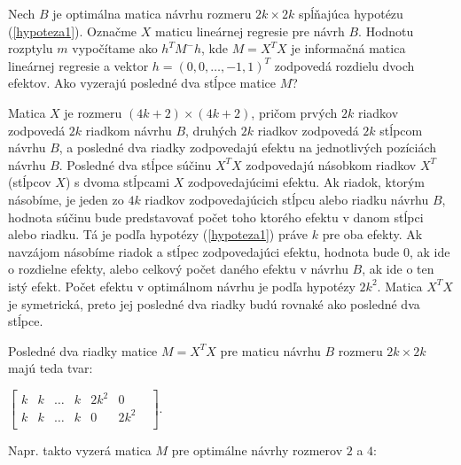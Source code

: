 \begin{dokaz}
Nech $B$ je optimálna matica návrhu rozmeru $2k \times 2k$ spĺňajúca hypotézu (\ref{hypoteza1}). Označme $X$ maticu lineárnej regresie pre návrh $B$. Hodnotu rozptylu $m$ vypočítame ako $h^T M^- h$,
kde $M = X^T X$ je informačná matica lineárnej regresie a vektor $h = (0, 0, \ldots, -1, 1)^T $ zodpovedá rozdielu dvoch efektov. Ako vyzerajú posledné dva stĺpce matice $M$?

Matica $X$ je rozmeru $(4k + 2) \times (4k + 2)$, pričom prvých $2k$ riadkov zodpovedá $2k$ riadkom návrhu $B$, druhých $2k$ riadkov zodpovedá $2k$ stĺpcom návrhu $B$,
a posledné dva riadky zodpovedajú efektu na jednotlivých pozíciách návrhu $B$. Posledné dva stĺpce súčinu $X^T X$ zodpovedajú násobkom riadkov $X^T$ (stĺpcov $X$) s dvoma stĺpcami $X$ zodpovedajúcimi efektu.
Ak riadok, ktorým násobíme, je jeden zo $4k$ riadkov zodpovedajúcich stĺpcu alebo riadku návrhu $B$, hodnota súčinu bude predstavovať počet toho ktorého efektu v danom stĺpci alebo riadku.
Tá je podľa hypotézy (\ref{hypoteza1}) práve $k$ pre oba efekty. Ak navzájom násobíme riadok a stĺpec zodpovedajúci efektu, hodnota bude $0$, ak ide o rozdielne efekty,
alebo celkový počet daného efektu v návrhu $B$, ak ide o ten istý efekt. Počet efektu v optimálnom návrhu je podľa hypotézy $2k^2$.
Matica $X^T X$ je symetrická, preto jej posledné dva riadky budú rovnaké ako posledné dva stĺpce.

Posledné dva riadky matice $M = X^T X$ pre maticu návrhu $B$ rozmeru $2k \times 2k$ majú teda tvar:

\begin{center}
$
\begin{bmatrix}
k & k & \ldots & k & 2k^2 & 0 & \\
k & k & \ldots & k & 0 & 2k^2 & \\
\end{bmatrix}
$.
\end{center}

Napr. takto vyzerá matica $M$ pre optimálne návrhy rozmerov $2$ a $4$:


\end{dokaz}
